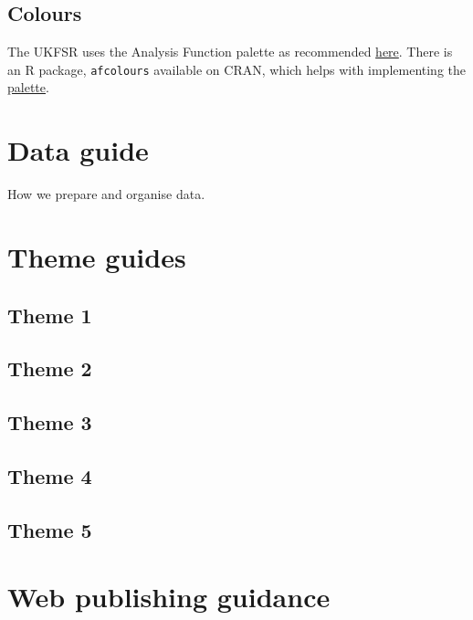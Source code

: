 \documentclass[
]{book}
\begin{document}
\hypertarget{colours}{%
\section{Colours}\label{colours}}

The UKFSR uses the Analysis Function palette as recommended \href{https://analysisfunction.civilservice.gov.uk/policy-store/data-visualisation-colours-in-charts/}{here}. There is an R package, \texttt{afcolours} available on CRAN, which helps with implementing the \href{https://best-practice-and-impact.github.io/afcolours/}{palette}.

\hypertarget{data-guide}{%
\chapter{Data guide}\label{data-guide}}

How we prepare and organise data.

\hypertarget{theme-guides}{%
\chapter{Theme guides}\label{theme-guides}}

\hypertarget{theme-1}{%
\section{Theme 1}\label{theme-1}}

\hypertarget{theme-2}{%
\section{Theme 2}\label{theme-2}}

\hypertarget{theme-3}{%
\section{Theme 3}\label{theme-3}}

\hypertarget{theme-4}{%
\section{Theme 4}\label{theme-4}}

\hypertarget{theme-5}{%
\section{Theme 5}\label{theme-5}}

\hypertarget{web-publishing-guidance}{%
\chapter{Web publishing guidance}\label{web-publishing-guidance}}
\end{document}
